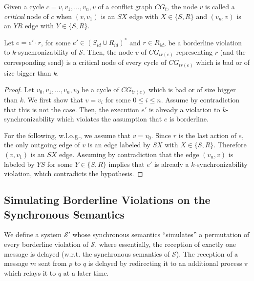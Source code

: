 Given a cycle $c = v,v_1,\ldots,v_n,v$ of a conflict graph $CG_t$, the node $v$ is called a \emph{critical} node of $c$ when $(v,v_1)$ is an $SX$ edge with $X\in \{S,R\}$ 
and $(v_n,v)$ is an $YR$ edge with $Y\in \{S,R\}$.

\begin{lemma}\label{lem:critical}
Let $e = e'\cdot r$, for some $e'\in (S_{id}\cup R_{id})^*$ and $r\in R_{id}$, be a borderline violation to $k$-synchronizability of $\mathcal{S}$. 
Then, the node $v$ of $CG_{tr(e)}$ representing $r$ (and the corresponding send) is a critical node of every cycle of 
$CG_{tr(e)}$ which is bad or of size bigger than $k$. %
\end{lemma}
\begin{proof}
Let $v_0,v_1,\ldots,v_n,v_0$ be a cycle of $CG_{tr(e)}$ which is bad or of size bigger than $k$. We first show that $v=v_i$ for some $0\leq i\leq n$. 
Assume by contradiction that this is not the case. Then, the execution $e'$ is already a violation to $k$-synchronizability which violates the assumption that $e$ is borderline.

For the following, w.l.o.g., we assume that $v=v_0$. Since $r$ is the last action of $e$, the only outgoing edge of $v$ is an edge labeled by $SX$ with $X\in \{S,R\}$. Therefore $(v,v_1)$ is an $SX$ edge. 
Assuming by contradiction that the edge $(v_n,v)$ is labeled by $YS$ for some $Y\in \{S,R\}$ implies that $e'$ is already a $k$-synchronizability violation, which contradicts the hypothesis.
\end{proof}


\subsection{Simulating Borderline Violations on the Synchronous Semantics}\label{ssec:verif2}

 We define a system $\mathcal{S'}$ whose synchronous semantics ``simulates'' a permutation of every borderline violation of 
$\mathcal{S}$, where essentially, the reception of exactly one message is delayed (w.r.t. the synchronous semantics of $\mathcal{S}$).
The reception of a message $m$ sent from $p$ to $q$ is delayed by redirecting it to an additional process $\pi$ which relays it
to $q$ at a later time. 

